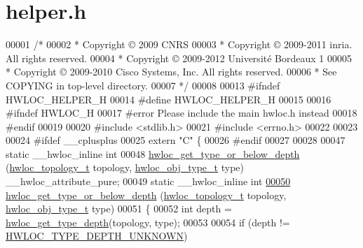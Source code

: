 \hypertarget{a00031_source}{
\section{helper.h}
}

\begin{DoxyCode}
00001 \textcolor{comment}{/*}
00002 \textcolor{comment}{ * Copyright © 2009 CNRS}
00003 \textcolor{comment}{ * Copyright © 2009-2011 inria.  All rights reserved.}
00004 \textcolor{comment}{ * Copyright © 2009-2012 Université Bordeaux 1}
00005 \textcolor{comment}{ * Copyright © 2009-2010 Cisco Systems, Inc.  All rights reserved.}
00006 \textcolor{comment}{ * See COPYING in top-level directory.}
00007 \textcolor{comment}{ */}
00008 
00013 \textcolor{preprocessor}{#ifndef HWLOC\_HELPER\_H}
00014 \textcolor{preprocessor}{}\textcolor{preprocessor}{#define HWLOC\_HELPER\_H}
00015 \textcolor{preprocessor}{}
00016 \textcolor{preprocessor}{#ifndef HWLOC\_H}
00017 \textcolor{preprocessor}{}\textcolor{preprocessor}{#error Please include the main hwloc.h instead}
00018 \textcolor{preprocessor}{}\textcolor{preprocessor}{#endif}
00019 \textcolor{preprocessor}{}
00020 \textcolor{preprocessor}{#include <stdlib.h>}
00021 \textcolor{preprocessor}{#include <errno.h>}
00022 
00023 
00024 \textcolor{preprocessor}{#ifdef \_\_cplusplus}
00025 \textcolor{preprocessor}{}\textcolor{keyword}{extern} \textcolor{stringliteral}{"C"} \{
00026 \textcolor{preprocessor}{#endif}
00027 \textcolor{preprocessor}{}
00028 
00047 \textcolor{keyword}{static} \_\_hwloc\_inline \textcolor{keywordtype}{int}
00048 \hyperlink{a00052_ga081be77905201e9f42318e9974456b45}{hwloc_get_type_or_below_depth} (\hyperlink{a00039_ga9d1e76ee15a7dee158b786c30b6a6e38}{hwloc_topology_t} topology, \hyperlink{a00041_gacd37bb612667dc437d66bfb175a8dc55}{hwloc_obj_type_t} type) 
      \_\_hwloc\_attribute\_pure;
00049 \textcolor{keyword}{static} \_\_hwloc\_inline \textcolor{keywordtype}{int}
\hypertarget{a00031_source_l00050}{}\hyperlink{a00052_ga081be77905201e9f42318e9974456b45}{00050} \hyperlink{a00052_ga081be77905201e9f42318e9974456b45}{hwloc_get_type_or_below_depth} (\hyperlink{a00039_ga9d1e76ee15a7dee158b786c30b6a6e38}{hwloc_topology_t} topology, \hyperlink{a00041_gacd37bb612667dc437d66bfb175a8dc55}{hwloc_obj_type_t} type)
00051 \{
00052   \textcolor{keywordtype}{int} depth = \hyperlink{a00046_gaea7c64dd59467f5201ba87712710b14d}{hwloc_get_type_depth}(topology, type);
00053 
00054   \textcolor{keywordflow}{if} (depth != \hyperlink{a00046_ggaf4e663cf42bbe20756b849c6293ef575a0565ab92ab72cb0cec91e23003294aad}{HWLOC_TYPE_DEPTH_UNKNOWN})

\end{DoxyCode}
